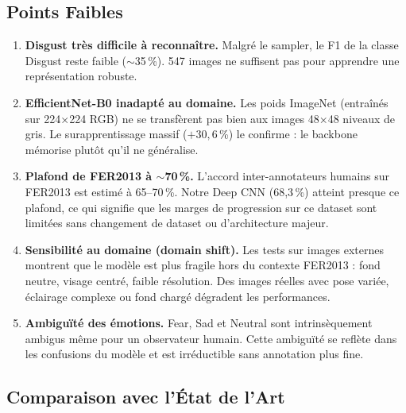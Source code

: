\documentclass[12pt,a4paper]{article}
\begin{document}
\subsection{Points Faibles}

\begin{tcolorbox}[colback=danger!8, colframe=danger, arc=4pt,
                  title={\bfseries Limitations identifiées}]
\begin{enumerate}
  \item \textbf{Disgust très difficile à reconnaître.}
        Malgré le sampler, le F1 de la classe Disgust reste faible
        ($\sim$35\,\%). 547 images ne suffisent pas pour apprendre une
        représentation robuste.

  \item \textbf{EfficientNet-B0 inadapté au domaine.}
        Les poids ImageNet (entraînés sur 224×224 RGB) ne se transfèrent pas
        bien aux images 48×48 niveaux de gris. Le surapprentissage massif
        ($+30,6$\,\%) le confirme : le backbone mémorise plutôt qu'il ne
        généralise.

  \item \textbf{Plafond de FER2013 à $\sim$70\,\%.}
        L'accord inter-annotateurs humains sur FER2013 est estimé à 65--70\,\%.
        Notre Deep CNN (68,3\,\%) atteint presque ce plafond, ce qui signifie
        que les marges de progression sur ce dataset sont limitées sans
        changement de dataset ou d'architecture majeur.

  \item \textbf{Sensibilité au domaine (domain shift).}
        Les tests sur images externes montrent que le modèle est plus fragile
        hors du contexte FER2013 : fond neutre, visage centré, faible résolution.
        Des images réelles avec pose variée, éclairage complexe ou fond chargé
        dégradent les performances.

  \item \textbf{Ambiguïté des émotions.}
        Fear, Sad et Neutral sont intrinsèquement ambigus même pour un
        observateur humain. Cette ambiguïté se reflète dans les confusions
        du modèle et est irréductible sans annotation plus fine.
\end{enumerate}
\end{tcolorbox}

\subsection{Comparaison avec l'État de l'Art}
\end{document}
